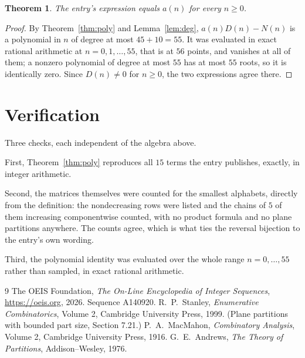 \documentclass[11pt,a4paper]{article}
\theoremstyle{plain}
\newtheorem{theorem}{Theorem}
\theoremstyle{definition}
\begin{document}
\begin{theorem}
The entry's expression equals $a(n)$ for every $n\ge0$.
\end{theorem}

\begin{proof}
By Theorem~\ref{thm:poly} and Lemma~\ref{lem:deg}, $a(n)D(n)-N(n)$ is a polynomial in $n$
of degree at most $45+10=55$. It was evaluated in exact rational arithmetic at
$n=0,1,\dots,55$, that is at $56$ points, and vanishes at all of them; a nonzero polynomial
of degree at most $55$ has at most $55$ roots, so it is identically zero. Since $D(n)\neq0$
for $n\ge0$, the two expressions agree there.
\end{proof}

\section{Verification}

Three checks, each independent of the algebra above.

First, Theorem~\ref{thm:poly} reproduces all $15$ terms the entry publishes,
exactly, in integer arithmetic.

Second, the matrices themselves were counted for the smallest alphabets, directly from the
definition: the nondecreasing rows were listed and the chains of $5$ of them increasing
componentwise counted, with no product formula and no plane partitions anywhere. The counts
agree, which is what ties the reversal bijection to the entry's own wording.

Third, the polynomial identity was evaluated over the whole range $n=0,\dots,55$ rather than
sampled, in exact rational arithmetic.

\begin{thebibliography}{9}
 The OEIS Foundation, \emph{The On-Line Encyclopedia of Integer
Sequences}, \url{https://oeis.org}, 2026. Sequence A140920.
 R.~P.~Stanley, \emph{Enumerative Combinatorics}, Volume 2, Cambridge
University Press, 1999. (Plane partitions with bounded part size, Section 7.21.)
 P.~A.~MacMahon, \emph{Combinatory Analysis}, Volume 2, Cambridge
University Press, 1916.
 G.~E.~Andrews, \emph{The Theory of Partitions}, Addison--Wesley, 1976.
\end{thebibliography}
\end{document}
